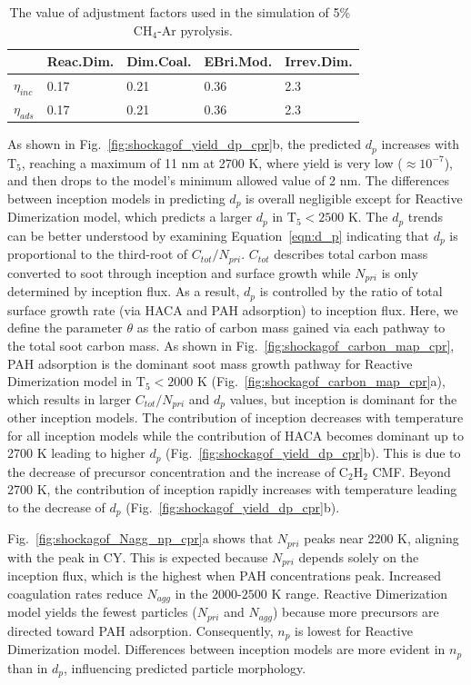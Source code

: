 \begin{table}[!t]
	\caption{The value of adjustment factors used in the simulation of 5\%~$\mathrm{CH_4}$-Ar pyrolysis.}
	\label{tab:adjustfactor_shock}
	\centering
	\begin{tabular}{lllll}
		\hline
		& Reac.Dim. & Dim.Coal. & EBri.Mod. & Irrev.Dim. \\
		\hline
		$\eta_{inc}$ & 0.17      & 0.21      & 0.36       & 2.3        \\
		$\eta_{ads}$ & 0.17      & 0.21      & 0.36       & 2.3 \\
		\hline       
	\end{tabular}
\end{table}


As shown in Fig.~\ref{fig:shockagof_yield_dp_cpr}b, the predicted $d_p$ increases with $\mathrm{T_5}$, reaching a maximum of 11 nm at 2700 K, where yield is very low ($\approx 10^{-7}$), and then drops to the model's minimum allowed value of 2 nm. The differences between inception models in predicting $d_p$ is overall negligible except for Reactive Dimerization model, which predicts a larger $d_p$ in $\mathrm{T_5}<2500$ K. The $d_p$ trends can be better understood by examining Equation~\eqref{eqn:d_p} indicating that $d_p$ is proportional to the third-root of $C_{tot}/N_{pri}$. $C_{tot}$ describes total carbon mass converted to soot through inception and surface growth while $N_{pri}$ is only determined by inception flux. As a result, $d_p$ is controlled by the ratio of total surface growth rate (via HACA and PAH adsorption) to inception flux. Here, we define the parameter $\theta$ as the ratio of carbon mass gained via each pathway to the total soot carbon mass. As shown in Fig.~\ref{fig:shockagof_carbon_map_cpr}, PAH adsorption is the dominant soot mass growth pathway for Reactive Dimerization model in $\mathrm{T_5}<2000$ K (Fig.~\ref{fig:shockagof_carbon_map_cpr}a), which results in larger $C_{tot}/N_{pri}$ and $d_p$ values, but inception is dominant for the other inception models. The contribution of inception decreases with temperature for all inception models while the contribution of HACA becomes dominant up to 2700 K leading to higher $d_p$ (Fig.~\ref{fig:shockagof_yield_dp_cpr}b). This is due to the decrease of precursor concentration and the increase of $\mathrm{C_2H_2}$ CMF. Beyond 2700 K, the contribution of inception rapidly increases with temperature leading to the decrease of $d_p$ (Fig.~\ref{fig:shockagof_yield_dp_cpr}b).

Fig.~\ref{fig:shockagof_Nagg_np_cpr}a shows that $N_{pri}$ peaks near 2200 K, aligning with the peak in CY. This is expected because $N_{pri}$ depends solely on the inception flux, which is the highest when PAH concentrations peak. Increased coagulation rates reduce $N_{agg}$ in the $2000$-$2500$ K range. Reactive Dimerization model yields the fewest particles ($N_{pri}$ and $N_{agg}$) because more precursors are directed toward PAH adsorption. Consequently, $n_p$ is lowest for Reactive Dimerization model. Differences between inception models are more evident in $n_p$ than in $d_p$, influencing predicted particle morphology.

